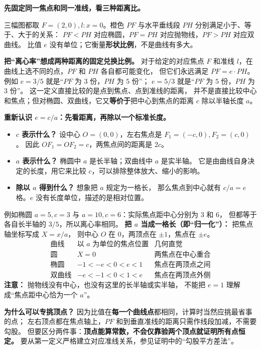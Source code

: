 \clearpage
\begin{explanationbox}
\textbf{先固定同一焦点和同一准线，看三种距离比。}

三幅图都取 $F=(2,0),l:x=0$。橙色 $PF$ 与水平垂线段 $PH$ 分别满足小于、等于、大于的关系：
$PF<PH$ 对应椭圆，$PF=PH$ 对应抛物线，$PF>PH$ 对应双曲线。
比值 $e$ 没有单位；它衡量\textbf{形状比例}，不是曲线有多大。


\medskip
\textbf{把“离心率”想成两种距离的固定兑换比例。}
对于给定的对应焦点 $F$ 和准线 $l$，在曲线上选不同的点，$PF$ 和 $PH$ 各自都可能变化，
但它们永远满足 $PF=e\cdot PH$。
例如 $e=3/5$ 就是“$PF$ 为 $3$ 份，$PH$ 为 $5$ 份”；
$e=5/3$ 就是“$PF$ 为 $5$ 份，$PH$ 为 $3$ 份”。
这一定义直接比较的是点到焦点、点到准线的距离，
并不是直接比较中心和焦点；但对椭圆、双曲线，它又\textbf{等价于}把中心到焦点的距离 $c$ 除以半轴长度 $a$。

\medskip
\textbf{重新认识 $e=c/a$：先看距离，再除以一个标准长度。}
\begin{itemize}
 \item \textbf{$c$ 表示什么？} 设中心 $O=(0,0)$，左右焦点是 $F_1=(-c,0),F_2=(c,0)$。
 因此 $OF_1=OF_2=c$，两焦点间的距离是 $2c$。
 \item \textbf{$a$ 表示什么？} 椭圆中 $a$ 是长半轴；双曲线中 $a$ 是实半轴。
 它是由曲线自身决定的长度，用它来比较 $c$，可以排除整体放大、缩小的影响。
 \item \textbf{除以 $a$ 得到什么？} 想象把 $a$ 规定为一格长，
 那么焦点到中心就有 $c/a=e$ 格。$e$ 没有长度单位，描述的是相对位置。
\end{itemize}
例如椭圆 $a=5,c=3$ 与 $a=10,c=6$：实际焦点距中心分别为 $3$ 和 $6$，
但都等于各自长半轴的 $3/5$，所以离心率相同。
\textbf{把 $a$ 当成一格长（即“归一化”）：} 把焦点轴坐标写成 $X=x/a$，
则中心 $O$ 在 $0$，两顶点在 $\pm1$，焦点在 $\pm e$。
\[
\begin{array}{c|c|c}
\text{曲线}&\text{以 $a$ 为单位的焦点位置}&\text{几何直觉}\\\hline
\text{圆}&X=0&\text{两焦点在中心重合}\\
\text{椭圆}&-1<-e<0<e<1&\text{焦点在两顶点之间}\\
\text{双曲线}&-e<-1<0<1<e&\text{焦点在两顶点外侧}
\end{array}
\]
\textbf{注意：} 抛物线没有中心，也没有这里的长半轴或实半轴，
不能把 $e=1$ 理解成“焦点距中心恰为一个 $a$”。


\medskip
\textbf{为什么可以专挑顶点？}
因为比值在\textbf{每一个曲线点}都相同，计算时当然应挑最省事的点；
左右顶点都在焦点轴上，$PF$ 和到垂直准线的距离只需作线段加减，不需要勾股。
但要区分两件事：\textbf{顶点能算常数，不会仅靠验两个顶点就证明所有点恒定。}
要从第一定义严格建立对应准线关系，参见证明中的“勾股平方差法”。


\end{explanationbox}
